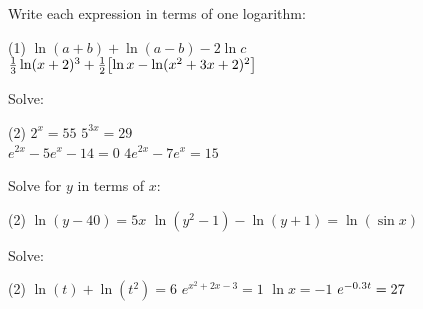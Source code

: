 \documentclass[mathNotesPreamble]{subfiles}
\begin{document}
  \begin{ex*}
    Write each expression in terms of one logarithm:\\
    
    \noindent
    \begin{minipage}{0.55\linewidth}
      \begin{extasks}(1)
        \task $\ln(a+b)+\ln(a-b)-2\ln c$\\[70pt]
        \task $\frac{1}{3}\ln(x+2)^3 +\frac{1}{2}\sbrkt{\ln x-\ln(x^2+3x+2)^2}$\\[30pt]
      \end{extasks}
    \end{minipage}%
    \begin{minipage}{0.45\linewidth}
      \begin{flushright}
      \end{flushright}
    \end{minipage}
  \end{ex*}
  \begin{center}
  \end{center}
  \pagebreak
  \begin{ex*}
    Solve:
    \begin{extasks}(2)
      \task $2^x=55$
      \task $5^{3x}=29$\\[40pt]
      \task $e^{2x}-5e^x-14=0$
      \task $4e^{2x}-7e^x=15$\\[40pt]
    \end{extasks}
  \end{ex*}
  \begin{ex*}
    Solve for $y$ in terms of $x$:
    \begin{extasks}(2)
      \task $\ln(y-40)=5x$
      \task $\ln(y^2-1)-\ln(y+1)=\ln(\sin x)$
    \end{extasks}
  \end{ex*}
  \vfill
  \begin{ex*}
    Solve:
    \begin{tasks}[after-item-skip=\stretch{1}](2)
      \task[] $\ln(t)+\ln(t^2)=6$
      \task[] $e^{x^2+2x-3}=1$
      \task[] $\ln x=-1$
      \task[] $e\inv[0.3t]=27$
    \end{tasks}
  \end{ex*}
  \pagebreak
  
\end{document}

